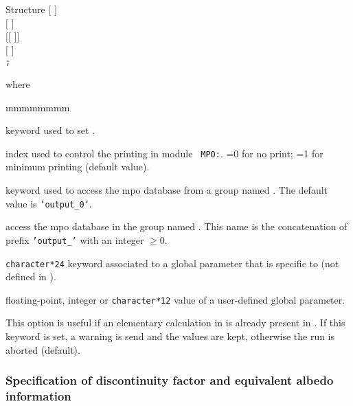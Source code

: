 \vskip -0.5cm

\begin{DataStructure}{Structure }
$[$   $]$ \\
$[$   $]$ \\
$[[$   $]]$ \\
$[$  $]$ \\
{\tt ;}
\end{DataStructure}

\noindent where
\begin{ListeDeDescription}{mmmmmmmm}

\item[\moc{EDIT}] keyword used to set .

\item[\dusa{iprint}] index used to control the printing in module {\tt
MPO:}. =0 for no print; =1 for minimum printing (default value).

\item[\moc{STEP}] keyword used to access the {\sc mpo} database from a group named .
The default value is {\tt 'output\_0'}.

\item[\dusa{NAMDIR}] access the {\sc mpo} database in the group named . This name is
the concatenation of prefix {\tt 'output\_'} with an integer $\ge 0$.

\item[\dusa{parkey}] {\tt character*24} keyword associated to a
global parameter that is specific to  (not defined in ).

\item[\dusa{value}] floating-point, integer or {\tt character*12} value of a user-defined
global parameter.

\item[\moc{WARNING-ONLY}] This option is useful if an elementary calculation in  
is already present in . If this keyword is set, a warning is send and the  values
are kept, otherwise the run is aborted (default).

\end{ListeDeDescription}

\subsubsection{Specification of discontinuity factor and equivalent albedo information}\label{sect:df_mpo}

